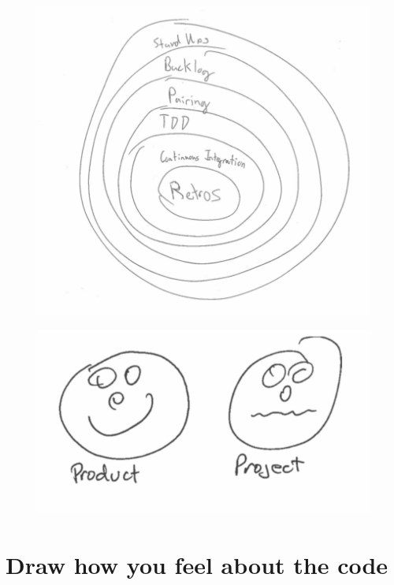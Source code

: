 \begin{figure}[h]
\centering
\includegraphics[width=6.5in]{interviews/drawings/2016_01_15.png}
\caption{}
\end{figure}

\begin{figure}[h]
\centering
\includegraphics[width=6.5in]{interviews/drawings/2016_02_25.png}
\caption{}
\end{figure}

\section{Draw how you feel about the code}
\label{AppendixFeelAboutTheCode}

